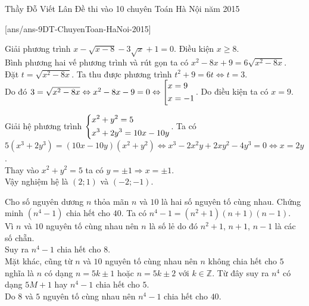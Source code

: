 \begin{name}
{Thầy Đỗ Viết Lân}
{Đề thi vào 10 chuyên Toán Hà Nội năm 2015}
\end{name}
\setcounter{ex}{0}
[ans/ans-9DT-ChuyenToan-HaNoi-2015]
\begin{ex}%
Giải phương trình $x - \sqrt{x-8}-3\sqrt{x} + 1 = 0$.
	\loigiai
		{
			Điều kiện $x \ge 8$.\\
			Bình phương hai vế phương trình và rút gọn ta có $x^2-8x+9=6\sqrt{x^2-8x}$.\\
			Đặt $t=\sqrt{x^2-8x}$. Ta thu được phương trình $t^2+9=6t \Leftrightarrow t = 3$.\\
			Do đó $3=\sqrt{x^2-8x} \Leftrightarrow x^2-8x -9 = 0 \Leftrightarrow \left[\begin{aligned}&x=9\\&x=-1\end{aligned}\right.$. Do điều kiện ta có $x=9$.
		}
\end{ex}

\begin{ex}%
Giải hệ phương trình $\left\{\begin{aligned}&x^2 + y^2 = 5 \\ &x^3 + 2y^3 = 10x - 10y\end{aligned}\right.$.
\loigiai
		{
		Ta có $5(x^3+2y^3) = (10x-10y)(x^2+y^2)\Leftrightarrow x^3 - 2x^2y+2xy^2-4y^3 = 0 \Leftrightarrow x = 2y$.\\
			Thay vào $x^2+y^2 = 5$ ta có $y= \pm 1 \Rightarrow x = \pm 1$.\\
			Vậy nghiệm hệ là $(2;1)$ và $(-2;-1)$.
			}
\end{ex}

\begin{ex}%
Cho số nguyên dương $n$ thỏa mãn $n$ và $10$ là hai số nguyên tố cùng nhau. Chứng minh $(n^4 - 1)$ chia hết cho $40$.
\loigiai
    {
		Ta có $n^4-1 = (n^2+1)(n+1)(n-1)$.\\
        Vì $n$ và $10$ nguyên tố cùng nhau nên $n$ là số lẻ do đó $n^2+1$, $n+1$, $n-1$ là các số chẵn.\\
        Suy ra $n^4 - 1$ chia hết cho $8$.\\
        Mặt khác, cũng từ $n$ và $10$ nguyên tố cùng nhau nên $n$ không chia hết cho $5$ nghĩa là $n$ có dạng $n=5k \pm 1$ hoặc $n = 5k \pm 2$ với $k \in \mathbb Z$. Từ đây suy ra $n^4$ có dạng $5M + 1$ hay $n^4 - 1$ chia hết cho $5$.\\
        Do $8$ và $5$ nguyên tố cùng nhau nên $n^4 - 1$ chia hết cho $40$.
    }
\end{ex}

